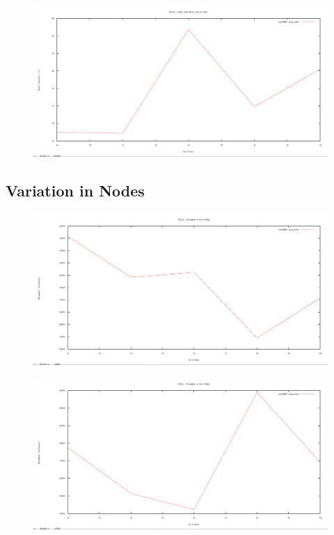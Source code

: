\documentclass[12pt]{article}
\begin{document}
\begin{figure}[H]
	\centering
	\includegraphics[scale=	0.26]{image/apics/am_packetdropratio_vs_flows.png}
\end{figure}





\subsection{Variation in Nodes}
\newpage

\begin{figure}[H]
	\centering
	\includegraphics[scale=	0.26]{image/bpics/bm_Throughput_vs_nodes.png}
\end{figure}

\begin{figure}[H]
	\centering
	\includegraphics[scale=	0.26]{image/apics/am_Throughput_vs_nodes.png}
\end{figure}
\end{document}
